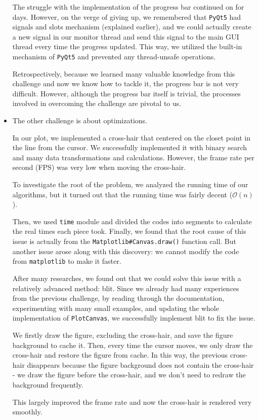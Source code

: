 \documentclass[fontsize=11pt]{article}
\newcommand{\bigO}{\mathcal{O}}
\begin{document}
\begin{itemize}
        The struggle with the implementation of the progress bar continued on for days. However, on the verge of giving up, we remembered that \verb|PyQt5| had signals and slots mechanism (explained earlier), and we could actually create a new signal in our monitor thread and send this signal to the main GUI thread every time the progress updated. This way, we utilized the built-in mechanism of \verb|PyQt5| and prevented any thread-unsafe operations.

        Retrospectively, because we learned many valuable knowledge from this challenge and now we know how to tackle it, the progress bar is not very difficult. However, although the progress bar itself is trivial, the processes involved in overcoming the challenge are pivotal to us. 

        \newpage

        \item The other challenge is about optimizations.
        
        In our plot, we implemented a cross-hair that centered on the closet point in the line from the cursor. We successfully implemented it with binary search and many data transformations and calculations. However, the frame rate per second (FPS) was very low when moving the cross-hair.

        To investigate the root of the problem, we analyzed the running time of our algorithms, but it turned out that the running time was fairly decent ($\bigO(n)$).
        
        Then, we used \verb|time| module and divided the codes into segments to calculate the real times each piece took. Finally, we found that the root cause of this issue is actually from the \verb|Matplotlib#Canvas.draw()| function call. But another issue arose along with this discovery: we cannot modify the code from \verb|matplotlib| to make it faster.
        
        After many researches, we found out that we could solve this issue with a relatively advanced method: blit. Since we already had many experiences from the previous challenge, by reading through the documentation, experimenting with many small examples, and updating the whole implementation of \verb|PlotCanvas|, we successfully implement blit to fix the issue.
        
        We firstly draw the figure, excluding the cross-hair, and save the figure background to cache it. Then, every time the cursor moves, we only draw the cross-hair and restore the figure from cache. In this way, the previous cross-hair disappears because the figure background does not contain the cross-hair - we draw the figure before the cross-hair, and we don't need to redraw the background frequently.

        This largely improved the frame rate and now the cross-hair is rendered very smoothly.
    \end{itemize}
\end{document}
